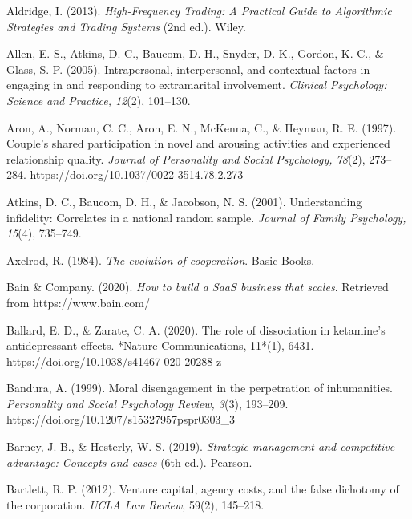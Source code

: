\begin{thebibliography}{}


    Aldridge, I. (2013). \textit{High-Frequency Trading: A Practical Guide to Algorithmic Strategies and Trading Systems} (2nd ed.). Wiley.

    Allen, E. S., Atkins, D. C., Baucom, D. H., Snyder, D. K., Gordon, K. C., \& Glass, S. P. (2005). Intrapersonal, interpersonal, and contextual factors in engaging in and responding to extramarital involvement. \textit{Clinical Psychology: Science and Practice, 12}(2), 101–130.

    Aron, A., Norman, C. C., Aron, E. N., McKenna, C., \& Heyman, R. E. (1997). Couple's shared participation in novel and arousing activities and experienced relationship quality. \textit{Journal of Personality and Social Psychology, 78}(2), 273--284. https://doi.org/10.1037/0022-3514.78.2.273
    
    Atkins, D. C., Baucom, D. H., \& Jacobson, N. S. (2001). Understanding infidelity: Correlates in a national random sample. \textit{Journal of Family Psychology, 15}(4), 735–749.

    Axelrod, R. (1984). \textit{The evolution of cooperation}. Basic Books.


    Bain \& Company. (2020). \textit{How to build a SaaS business that scales}. Retrieved from https://www.bain.com/

    Ballard, E. D., \& Zarate, C. A. (2020). The role of dissociation in ketamine’s antidepressant effects. *Nature Communications, 11*(1), 6431. https://doi.org/10.1038/s41467-020-20288-z

    Bandura, A. (1999). Moral disengagement in the perpetration of inhumanities. \textit{Personality and Social Psychology Review, 3}(3), 193–209. https://doi.org/10.1207/s15327957pspr0303\_3

    Barney, J. B., \& Hesterly, W. S. (2019). \textit{Strategic management and competitive advantage: Concepts and cases} (6th ed.). Pearson.

    Bartlett, R. P. (2012). Venture capital, agency costs, and the false dichotomy of the corporation. \textit{UCLA Law Review}, 59(2), 145–218.


\end{thebibliography}

